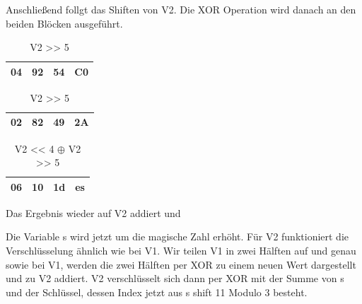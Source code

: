 \documentclass[course=asp]{aspdoc}
\begin{document}
Anschließend follgt das Shiften von V2. Die XOR Operation wird danach an den beiden Blöcken ausgeführt.
\begin{table}[H]
    
    \begin{minipage}{.5\linewidth}
      
      \centering
        \begin{tabular}{|l|l|l|l|}
		\hline
            04 & 92 & 54 & C0   \\
		\hline
        \end{tabular}

	\caption{V2 << 4}
    \end{minipage}%
    \begin{minipage}{.5\linewidth}
    
 \centering
        
        \begin{tabular}{|l|l|l|l|}
           \hline
		 02 & 82 & 49 & 2A   \\
		\hline
        \end{tabular}
\caption{V2 >> 5} 
    \end{minipage}
\end{table}

\begin{table}[H]
\centering 
    \begin{tabular}{|l|l|l|l|}
        \hline
        06 & 10 & 1d & es    \\
        \hline
    \end{tabular}
    \caption{V2 << 4 $\oplus$ V2 >> 5}
\end{table}
Das Ergebnis wieder auf V2 addiert und 
  








Die Variable s wird jetzt um die magische Zahl erhöht. Für V2 funktioniert die Verschlüsselung ähnlich wie bei V1. Wir teilen V1 in zwei Hälften auf und genau sowie bei V1, werden die zwei Hälften per XOR zu einem neuen Wert dargestellt und zu V2 addiert. V2 verschlüsselt sich dann per XOR mit der Summe von s und der Schlüssel, dessen Index jetzt aus s shift 11 Modulo 3 besteht. 
\end{document}
